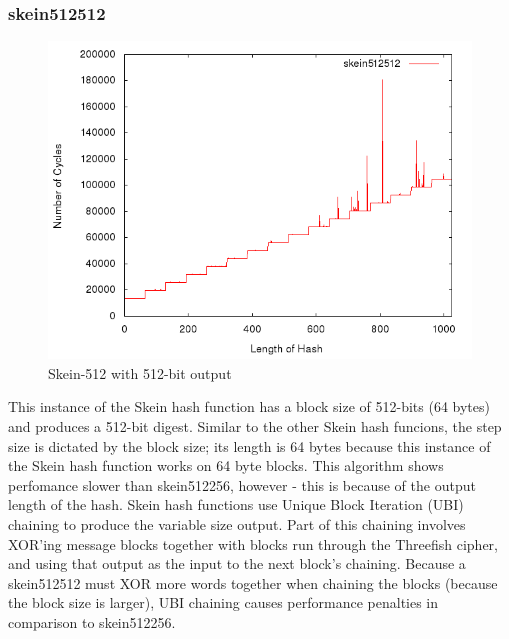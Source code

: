 \documentclass[10pt,a4paper]{article}
\begin{document}
\subsubsection{skein512512}

    \begin{figure}[H]
        \begin{center}
            \includegraphics[scale=0.5]{images/skein512512.png} 
            \caption{Skein-512 with 512-bit output}
        \end{center}
    \end{figure}

This instance of the Skein hash function has a block size of 512-bits (64 bytes) and produces a 512-bit digest.  Similar to the other Skein hash funcions, the step size is dictated by the block size; its length is 64 bytes because this instance of the Skein hash function works on 64 byte blocks.  This algorithm shows perfomance slower than skein512256, however - this is because of the output length of the hash.  Skein hash functions use Unique Block Iteration (UBI) chaining to produce the variable size output.  Part of this chaining involves XOR'ing message blocks together with blocks run through the Threefish cipher, and using that output as the input to the next block's chaining.  Because a skein512512 must XOR more words together when chaining the blocks (because the block size is larger), UBI chaining causes performance penalties in comparison to skein512256.
\end{document}
